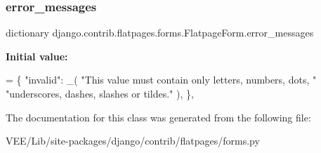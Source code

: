 \subsubsection{\texorpdfstring{error\+\_\+messages}{error\_messages}}
{\footnotesize\ttfamily dictionary django.\+contrib.\+flatpages.\+forms.\+Flatpage\+Form.\+error\+\_\+messages\hspace{0.3cm}{\ttfamily [static]}}

{\bfseries Initial value\+:}
\begin{DoxyCode}
= \{
            \textcolor{stringliteral}{"invalid"}: \_(
                \textcolor{stringliteral}{"This value must contain only letters, numbers, dots, "}
                \textcolor{stringliteral}{"underscores, dashes, slashes or tildes."}
            ),
        \},
\end{DoxyCode}


The documentation for this class was generated from the following file\+:\begin{DoxyCompactItemize}
\item 
V\+E\+E/\+Lib/site-\/packages/django/contrib/flatpages/forms.\+py\end{DoxyCompactItemize}
